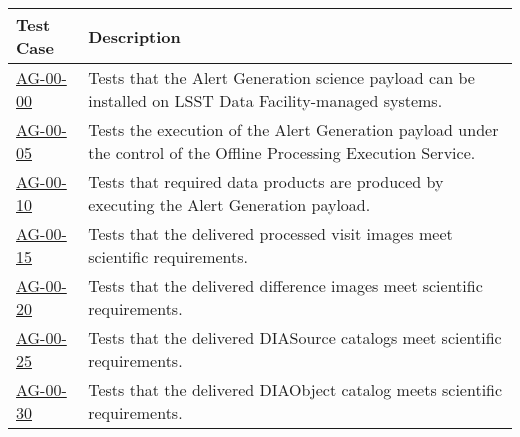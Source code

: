 \begin{longtable} {|p{}|p{}|}\hline
\textbf{Test Case}  & \textbf{Description} \\\hline

\hyperref[ag-00-00]{AG-00-00} & Tests that the Alert Generation science payload can be installed on LSST Data Facility-managed systems.\\\hline
\hyperref[ag-00-05]{AG-00-05} & Tests the execution of the Alert Generation
payload under the control of the Offline Processing Execution Service.\\\hline
\hyperref[ag-00-10]{AG-00-10} & Tests that required data products are
produced by executing the Alert Generation payload. \\\hline
\hyperref[ag-00-15]{AG-00-15} & Tests that the delivered processed visit images meet scientific requirements. \\\hline
\hyperref[ag-00-20]{AG-00-20} & Tests that the delivered difference images meet scientific requirements. \\\hline
\hyperref[ag-00-25]{AG-00-25} & Tests that the delivered DIASource catalogs meet scientific requirements. \\\hline
\hyperref[ag-00-30]{AG-00-30} & Tests that the delivered DIAObject
	catalog meets scientific requirements. \\\hline
\end{longtable}
